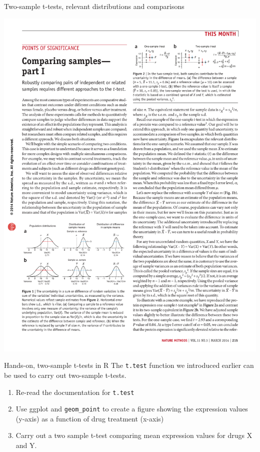 \documentclass[presentation]{beamer}
\begin{document}
\begin{frame}[label={sec:org13f7c3c}]{Two-sample t-tests, relevant distributions and comparisons}
\begin{center}
\includegraphics[height=0.30\textheight]{fig-twosample-ttest.pdf}
\end{center}
\end{frame}


\begin{frame}[fragile,label={sec:org0bba875}]{Hands-on, two-sample t-tests in R}
 The \texttt{t.test} function we introduced earlier can be used to carry out two-sample t-tests. 

\begin{enumerate}
\item Re-read the documentation for \texttt{t.test}
\item Use ggplot and \texttt{geom\_point} to create a figure showing the expression values (y-axis) as a function of drug treatment (x-axis)
\item Carry out a two sample t-test comparing mean expression values for drugs X and Y.
\end{enumerate}
\end{frame}
\end{document}
